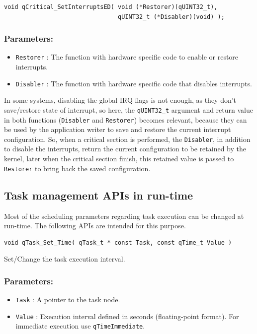 \documentclass{article}
\begin{document}
\begin{lstlisting}[style=CStyle]
void qCritical_SetInterruptsED( void (*Restorer)(qUINT32_t), 
                                qUINT32_t (*Disabler)(void) );
\end{lstlisting}

\subsubsection*{Parameters:}
\begin{itemize}
    \item \lstinline{Restorer} : The function with hardware specific code to enable or restore interrupts.
    \item \lstinline{Disabler} : The function with hardware specific code that disables interrupts.
\end{itemize}

In some systems, disabling the global IRQ flags is not enough, as they don't save/restore state of interrupt, so here, the \lstinline{qUINT32_t} argument and return value in both functions (\lstinline{Disabler} and \lstinline{Restorer}) becomes relevant, because they can be used by the application writer to save and restore the current interrupt configuration. So, when a critical section is performed, the \lstinline{Disabler}, in addition to disable the interrupts, return the current configuration to be retained by the kernel, later when the critical section finish, this retained value is passed to \lstinline{Restorer} to bring back the saved configuration. 

\subsection{Task management APIs in run-time }
Most of the scheduling parameters regarding task execution can be changed at run-time. The following APIs are intended for this purpose. \\


\begin{lstlisting}[style=CStyle]
void qTask_Set_Time( qTask_t * const Task, const qTime_t Value )
\end{lstlisting}

Set/Change the task execution interval. 

\subsubsection*{Parameters:}
\begin{itemize}
    \item \lstinline{Task} : A pointer to the task node.
    \item \lstinline{Value} : Execution interval defined in seconds (floating-point format). For immediate execution use \lstinline{qTimeImmediate}.
\end{itemize}
\end{document}
